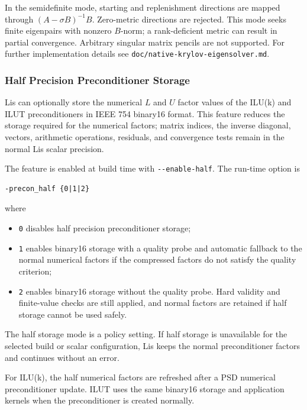 \documentclass[a4paper]{article}
\begin{document}
In the semidefinite mode, starting and replenishment
directions are mapped through $(A-\sigma B)^{-1}B$.
Zero-metric directions are rejected. This mode seeks
finite eigenpairs with nonzero $B$-norm; a rank-deficient
metric can result in partial convergence.
Arbitrary singular matrix pencils are not supported.
For further
implementation details see
\verb|doc/native-krylov-eigensolver.md|.

\subsubsection{Half Precision Preconditioner Storage}

Lis can optionally store the numerical $L$ and $U$ factor values of the
ILU(k) and ILUT preconditioners in IEEE 754 binary16 format. This feature
reduces the storage required for the numerical factors; matrix indices,
the inverse diagonal, vectors, arithmetic operations, residuals, and
convergence tests remain in the normal Lis scalar precision.

The feature is enabled at build time with
\verb|--enable-half|. The run-time option is

\begin{verbatim}
-precon_half {0|1|2}
\end{verbatim}

where

\begin{itemize}
\item \verb|0| disables half precision preconditioner storage;
\item \verb|1| enables binary16 storage with a quality probe and automatic
fallback to the normal numerical factors if the compressed factors do not
satisfy the quality criterion;
\item \verb|2| enables binary16 storage without the quality probe. Hard
validity and finite-value checks are still applied, and normal factors are
retained if half storage cannot be used safely.
\end{itemize}

The half storage mode is a policy setting. If half storage is unavailable
for the selected build or scalar configuration, Lis keeps the normal
preconditioner factors and continues without an error.

For ILU(k), the half numerical factors are refreshed after a PSD numerical
preconditioner update. ILUT uses the same binary16 storage and application
kernels when the preconditioner is created normally.
\end{document}

